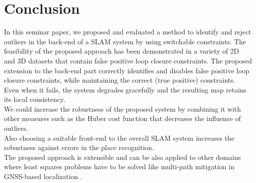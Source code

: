 \documentclass[9pt,technote]{IEEEtran}
\begin{document}
\section{Conclusion}
In this seminar paper, we proposed and evaluated a method to identify and reject outliers in  the  back-end  of  a  SLAM  system  by  using  switchable constraints.
The  feasibility  of  the  proposed  approach  has been demonstrated in a variety of  2D and 3D datasets that contain false positive loop closure constraints.
The proposed extension to the back-end part correctly identifies and disables false positive loop closure
constraints, while maintaining the correct (true positive) constraints. Even when it fails, the system degrades gracefully and the resulting map retains its local consistency. \\
We could increase the robustness of the proposed system by combining it with other measures such as the Huber cost function that decreases the influence of outliers.\\
Also choosing a suitable front-end to the overall SLAM system increases the robustness against errors in the place recognition.\\
The proposed approach is extensible and can be also applied to other domains where least squares problems have to be solved like multi-path mitigation in  GNSS-based localization .
\cite{sunderhauf2012switchable}


\end{document}
